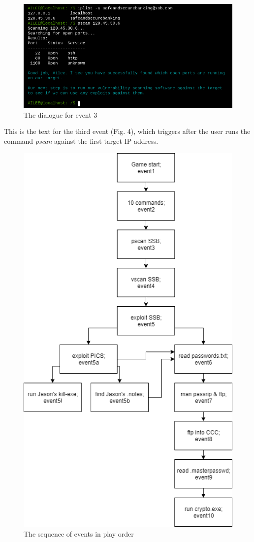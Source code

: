 \documentclass[conference]{IEEEtran}
\begin{document}
\begin{figure}[htbp]
	\centerline{\includegraphics[scale=1.39]{event3}}
	\caption{The dialogue for event 3}
	\label{fig}
\end{figure}

This is the text for the third event (Fig. 4), which triggers after the user runs the command \textit{pscan} against the first target IP address.

\begin{figure}[hp]
    \centerline{\includegraphics[scale=0.5]{gameflow.png}}
    \caption{The sequence of events in play order}
    \label{fig:gameplay-sequence}
\end{figure}
\end{document}
